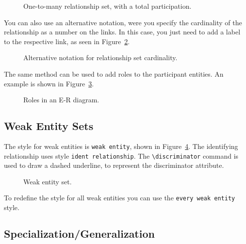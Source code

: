 \documentclass[12pt]{article}
\newcommand{\demo}[1]{
  \bigskip
  \begin{minipage}{\linewidth}
      \begin{center}
          
      \end{center}
      \begin{center}
          
      \end{center}
  \end{minipage}
}
\begin{document}
\begin{figure}[htb!]
    \centering
    \demo{relationship1-M}
    \caption{One-to-many relationship set, with a total participation.}
\label{fig:relationship1-M}
\end{figure}

You can also use an alternative notation, were you specify the cardinality of
the relationship as a number on the links. In this case, you just need to add a
label to the respective link, as seen in Figure~\ref{fig:relationship-card}.

\begin{figure}[htb!]
    \centering
    \demo{relationship-card}
    \caption{Alternative notation for relationship set cardinality.}
\label{fig:relationship-card}
\end{figure}

The same method can be used to add roles to the participant entities. An
example is shown in Figure~\ref{fig:roles}.

\begin{figure}[htb!]
    \centering
    \demo{roles}
    \caption{Roles in an E-R diagram.}
\label{fig:roles}
\end{figure}

\subsection{Weak Entity Sets}
\label{sec:weak-entities}

The style for weak entities is \texttt{weak entity}, shown in
Figure~\ref{fig:weak}. The identifying relationship uses style
\texttt{ident relationship}. The \verb+\discriminator+ command is used to
draw a dashed underline, to represent the discriminator attribute.

\begin{figure}[htb!]
    \centering
    \demo{weak}
    \caption{Weak entity set.}
\label{fig:weak}
\end{figure}

To redefine the style for all weak entities you can use the \texttt{every weak
  entity} style.

%

\subsection{Specialization/Generalization}
\label{sec:spec}
\end{document}
